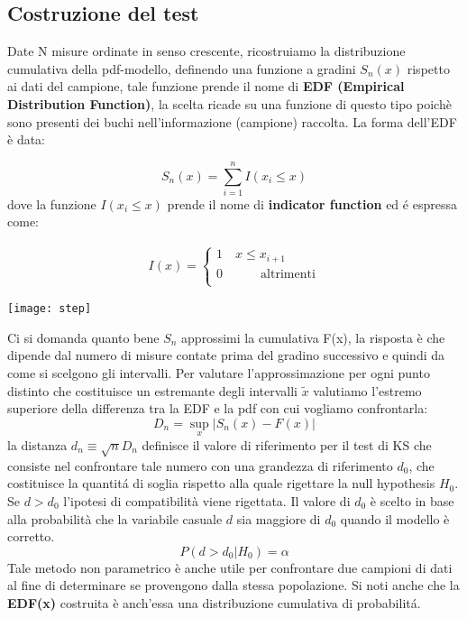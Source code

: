 \subsection{Costruzione del test}

Date N misure ordinate in senso crescente, ricostruiamo la distribuzione cumulativa della pdf-modello, definendo una funzione a gradini $S_n (x)$ rispetto ai dati del campione, tale funzione prende il nome di \textbf{EDF (Empirical Distribution Function)}, la scelta ricade su una funzione di questo tipo poich\`{e} sono presenti dei buchi nell'informazione (campione) raccolta. La forma dell'EDF \`{e} data:

\begin{equation}
	S_n(x) = \sum_{i=1}^nI(x_i \leq x)  
\end{equation}
dove la funzione $I(x_i \leq x)$ prende il nome di \textbf{indicator function} ed \'{e} espressa come:

\vspace{0.2in}

\begin{minipage}{.4\textwidth}
	\begin{align*}
I(x) = 
	\begin{cases}
	1 \quad x \leq x_{i+1} \\
	0 \quad \quad \quad \text{altrimenti}\\
	\end{cases}
\end{align*}
  \end{minipage}
  \begin{minipage}{.4\textwidth}
    \centering
    \texttt{[image: step]}	
  \end{minipage}
\vspace{0.2in}

Ci si domanda quanto bene $S_n$ approssimi la cumulativa F(x), la risposta \`{e} che dipende dal numero di misure contate prima del gradino successivo e quindi da come si scelgono gli intervalli. Per valutare l'approssimazione per ogni punto distinto che costituisce un estremante degli intervalli $\tilde{x}$ valutiamo l'estremo superiore della differenza tra la EDF e la pdf con cui vogliamo confrontarla:
\begin{equation*}
	D_n = \sup_{x} \vert S_n(x) -F(x) \vert 
\end{equation*}
 la distanza $d_n \equiv \sqrt{n}D_n$ definisce il valore di riferimento per il test di KS che consiste nel confrontare tale numero con una grandezza di riferimento $d_0$, che costituisce la quantit\'{a} di soglia rispetto alla quale rigettare la null hypothesis $H_0$. Se $d > d_0$ l'ipotesi di compatibilit\`{a} viene rigettata. Il valore di $d_0$ \`{e} scelto in base alla probabilit\`{a} che la variabile casuale $d$ sia maggiore di $d_0$ quando il modello \`{e} corretto.
 \begin{equation*}
 	P( d > d_0 \vert H_0) = \alpha
 \end{equation*}
Tale metodo non parametrico \`{e} anche utile per confrontare due campioni di dati al fine di determinare se provengono dalla stessa popolazione. Si noti anche che la \textbf{EDF(x)} costruita \`{e} anch'essa una distribuzione cumulativa di probabilit\'{a}.
 
